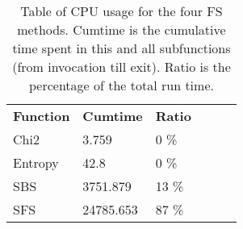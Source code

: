 \begin{table}[htbp]
\begin{center}
\begin{tabular}{|l|l|l|l|l|l|}
\cline{1-3}
\textbf{Function} & \textbf{Cumtime} & \textbf{Ratio}  \\
\cline{1-3}
          Chi2 &   3.759  &   0 \% \\
          Entropy &   42.8  &  0 \% \\
          SBS &   3751.879  &  13 \% \\
          SFS &   24785.653  & 87 \% \\

\cline{1-3}
\end{tabular}
\caption[]
{\small
  Table of CPU usage for the four FS methods. Cumtime is the cumulative time spent in this and all subfunctions (from invocation till exit). Ratio is the percentage of the total run time.
}
\label{table:cpu}
\end{center}
\end{table}




%
%
%
